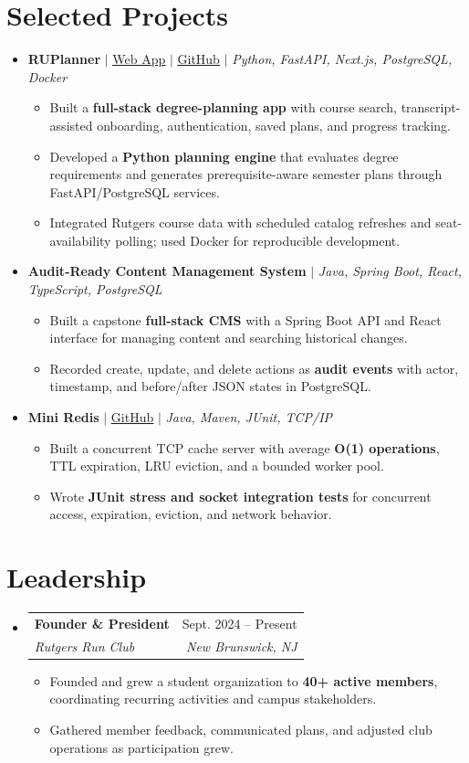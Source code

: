 \documentclass[letterpaper,10pt]{article}
\makeatletter
\newcommand{\resumeItem}[1]{\item\small{#1}}
\newcommand{\resumeSubheading}[4]{
  \vspace{1pt}\item
  \begin{tabular*}{0.97\textwidth}[t]{l@{\extracolsep{\fill}}r}
    \textbf{#1} & #2 \\
    \textit{\small #3} & \textit{\small #4} \\
  \end{tabular*}\vspace{-3pt}
}
\newcommand{\resumeProjectHeading}[1]{\vspace{3pt}\item\small{#1}\vspace{0pt}}
\newcommand{\resumeSubHeadingListStart}{\begin{itemize}[leftmargin=0.15in,label={},itemsep=0pt,topsep=0pt]}
\newcommand{\resumeSubHeadingListEnd}{\end{itemize}}
\newcommand{\resumeItemListStart}{\begin{itemize}[leftmargin=0.15in,label=\textbullet,itemsep=-2pt,topsep=0pt]}
\newcommand{\resumeItemListEnd}{\end{itemize}\vspace{0pt}}
\makeatother
\begin{document}
\section{Selected Projects}
\resumeSubHeadingListStart
  \resumeProjectHeading{\textbf{RUPlanner} $|$ \href{https://ruplanner.app/}{\underline{Web App}} $|$ \href{https://github.com/ameer-rah/RUPlanner}{\underline{GitHub}} $|$ \emph{Python, FastAPI, Next.js, PostgreSQL, Docker}}
    \resumeItemListStart
      \resumeItem{Built a \textbf{full-stack degree-planning app} with course search, transcript-assisted onboarding, authentication, saved plans, and progress tracking.}
      \resumeItem{Developed a \textbf{Python planning engine} that evaluates degree requirements and generates prerequisite-aware semester plans through FastAPI/PostgreSQL services.}
      \resumeItem{Integrated Rutgers course data with scheduled catalog refreshes and seat-availability polling; used Docker for reproducible development.}
    \resumeItemListEnd
  \resumeProjectHeading{\textbf{Audit-Ready Content Management System} $|$ \emph{Java, Spring Boot, React, TypeScript, PostgreSQL}}
    \resumeItemListStart
      \resumeItem{Built a capstone \textbf{full-stack CMS} with a Spring Boot API and React interface for managing content and searching historical changes.}
      \resumeItem{Recorded create, update, and delete actions as \textbf{audit events} with actor, timestamp, and before/after JSON states in PostgreSQL.}
    \resumeItemListEnd
  \resumeProjectHeading{\textbf{Mini Redis} $|$ \href{https://github.com/ameer-rah/mini-redis}{\underline{GitHub}} $|$ \emph{Java, Maven, JUnit, TCP/IP}}
    \resumeItemListStart
      \resumeItem{Built a concurrent TCP cache server with average \textbf{O(1) operations}, TTL expiration, LRU eviction, and a bounded worker pool.}
      \resumeItem{Wrote \textbf{JUnit stress and socket integration tests} for concurrent access, expiration, eviction, and network behavior.}
    \resumeItemListEnd
\resumeSubHeadingListEnd

\section{Leadership}
\resumeSubHeadingListStart
  \resumeSubheading{Founder \& President}{Sept. 2024 -- Present}
    {Rutgers Run Club}{New Brunswick, NJ}
    \resumeItemListStart
      \resumeItem{Founded and grew a student organization to \textbf{40+ active members}, coordinating recurring activities and campus stakeholders.}
      \resumeItem{Gathered member feedback, communicated plans, and adjusted club operations as participation grew.}
    \resumeItemListEnd
\resumeSubHeadingListEnd
\end{document}
